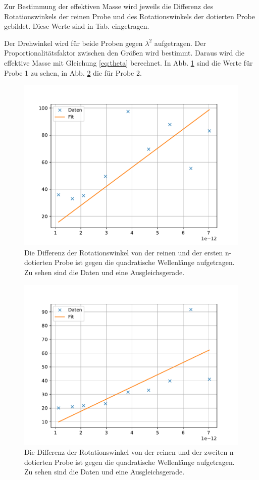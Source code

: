 Zur Bestimmung der effektiven Masse wird jeweils die Differenz des Rotationswinkels der reinen Probe und des Rotationswinkels der dotierten Probe gebildet. Diese Werte sind in Tab. eingetragen.

Der Drehwinkel wird für beide Proben gegen $\lambda^2$ aufgetragen. Der Proportionalitätsfaktor zwischen den Größen wird bestimmt. Daraus wird die effektive Masse mit Gleichung \ref{eq:theta} berechnet. In Abb. \ref{fig:probe1} sind die Werte für Probe 1 zu sehen, in Abb. \ref{fig:probe2} die für Probe 2.
\begin{figure}
    \centering
    \includegraphics[width=15cm]{plots/Probe1.pdf}
    \caption{Die Differenz der Rotationswinkel von der reinen und der ersten n-dotierten Probe ist gegen die quadratische Wellenlänge aufgetragen. Zu sehen sind die Daten und eine Ausgleichsgerade.}
    \label{fig:probe1}
\end{figure}

\begin{figure}
    \centering
    \includegraphics[width=15cm]{plots/Probe2.pdf}
    \caption{Die Differenz der Rotationswinkel von der reinen und der zweiten n-dotierten Probe ist gegen die quadratische Wellenlänge aufgetragen. Zu sehen sind die Daten und eine Ausgleichsgerade.}
    \label{fig:probe2}
\end{figure}

